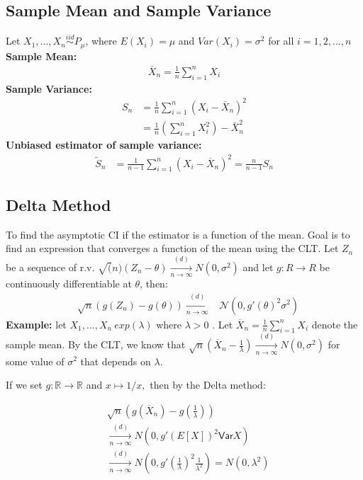\subsection{Sample Mean and Sample Variance}
Let $X_1, ..., X_n \stackrel{iid}{\sim} P_{\mu}$, where $E(X_i)=\mu$ and $Var(X_i)=\sigma^2$ for all $i=1,2,...,n$\\
\textbf{Sample Mean:}
\begin{align*}
\bar{X}_n= \frac{1}{n} \sum_{i=1}^{n} X_i
\end{align*}
\textbf{Sample Variance:}
\begin{align*}
S_n &= \frac{1}{n} \sum_{i=1}^{n} (X_i - \bar{X}_n)^2\\ 
&= \frac{1}{n} (\sum_{i=1}^{n} X_i^2) - \bar{X}_n^2
\end{align*}
\textbf{Unbiased estimator of sample variance:}
\begin{align*}
\tilde{S}_n &= \displaystyle  \frac{1}{n-1} \sum _{i=1}^ n \left(X_ i - \overline{X}_ n\right)^2 = \frac{n}{n-1} S_n
\end{align*}
\subsection{Delta Method}

To find the asymptotic CI if the estimator is a function of the mean. Goal is to find an expression that converges a function of the mean using the CLT. Let $Z_n$ be a sequence of r.v. $\sqrt(n) (Z_n-\theta) \xrightarrow[n \rightarrow \infty]{(d)} N(0,\sigma^2)$ and let $g: R\longrightarrow R$ be continuously differentiable at $\theta$, then:
\begin{align*}
&\sqrt{n}(g(Z_n) - g(\theta))   \xrightarrow [n \to \infty ]{(d)} &\mathcal{N}(0, g'(\theta )^2 \sigma ^2)
\end{align*}
\textbf{Example:} let  $X_1,... ,X_n ~ exp(\lambda)$  where  $\lambda>0$ . Let  $\overline{X}_ n= \frac{1}{n} \sum _{i = 1}^ n X_ i$ denote the sample mean. By the CLT, we know that $\sqrt{n}\left(\overline{X}_ n - \frac{1}{\lambda }\right) \xrightarrow [n \to \infty ]{(d)} N(0, \sigma ^2)$ for some value of  $\sigma^2$  that depends on  $\lambda$.

If we set $g: \displaystyle \mathbb {R} \to \mathbb {R}$ and $\displaystyle x \mapsto 1/x,$ then by the Delta method:

\begin{align*}
&\sqrt{n}\left( g(\overline{X}_ n) - g\left(\frac{1}{\lambda }\right) \right)\\
&\xrightarrow [n \to \infty ]{(d)} N(0, g'(E[X])^2\textsf{Var}{X})\\
&\xrightarrow [n \to \infty ]{(d)} N(0, g'\left(\frac{1}{\lambda }\right)^2\frac{1}{\lambda ^2}) =  N(0, \lambda^2)
\end{align*}